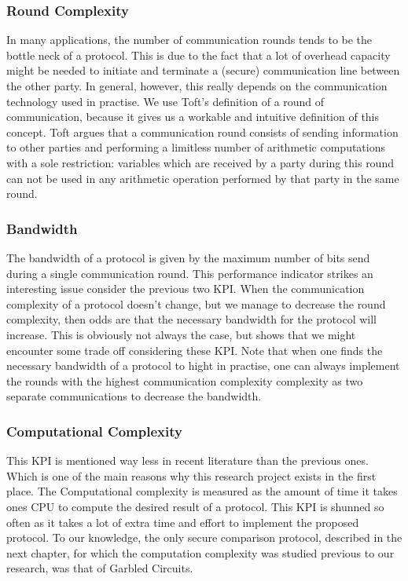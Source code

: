 \subsubsection{Round Complexity}
In many applications, the number of communication rounds tends to be the bottle neck of a protocol. This is due to the fact that a lot of overhead capacity might be needed to initiate and terminate a (secure) communication line between the other party. In general, however, this really depends on the communication technology used in practise. We use Toft’s definition of a round of communication, because it gives us a workable and intuitive definition of this concept. Toft argues that a communication round consists of sending information to other parties and performing a limitless number of arithmetic computations with a sole restriction: variables which are received by a party during this round can not be used in any arithmetic operation performed by that party in the same round.

\subsubsection{Bandwidth}
The bandwidth of a protocol is given by the maximum number of bits send during a single communication round. This performance indicator strikes an interesting issue consider the previous two KPI. When the communication complexity of a protocol doesn’t change, but we manage to decrease the round complexity, then odds are that the necessary bandwidth for the protocol will increase. This is obviously not always the case, but shows that we might encounter some trade off considering these KPI. Note that when one finds the necessary bandwidth of a protocol to hight in practise, one can always implement the rounds with the highest communication complexity complexity as two separate communications to decrease the bandwidth.

\subsubsection{Computational Complexity}
This KPI is mentioned way less in recent literature than the previous ones. Which is one of the main reasons why this research project exists in the first place. The Computational complexity is measured as the amount of time it takes ones CPU to compute the desired result of a protocol. This KPI is shunned so often as it takes a lot of extra time and effort to implement the proposed protocol. To our knowledge, the only secure comparison protocol, described in the next chapter, for which the computation complexity was studied previous to our research, was that of Garbled Circuits.